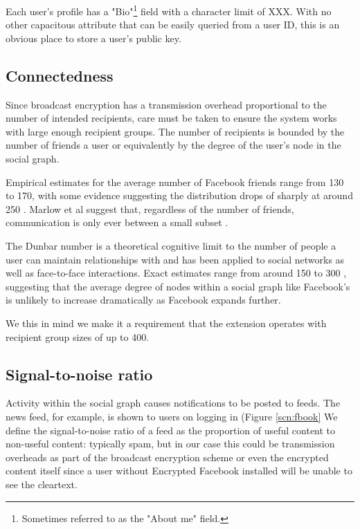 Each user's profile has a "Bio"\footnote{Sometimes referred to as the "About me" field.} field with a character limit of XXX. With no other capacitous attribute that can be easily queried from a user ID, this is an obvious place to store a user's public key.

    
\FloatBarrier
\subsection{Connectedness}

Since broadcast encryption has a transmission overhead proportional to the number of intended recipients, care must be taken to ensure the system works with large enough recipient groups. The number of recipients is bounded by the number of friends a user or equivalently by the degree of the user's node in the social graph. 

Empirical estimates for the average number of Facebook friends range from 130 to 170, with some evidence suggesting the distribution drops of sharply at around 250 \cite{fb-factsheet} \cite{fb-connectedness}. Marlow et al suggest that, regardless of the number of friends, communication is only ever between a small subset \cite{burke2010social}.

The Dunbar number is a theoretical cognitive limit to the number of people a user can maintain relationships with and has been applied to social networks as well as face-to-face interactions. Exact estimates range from around 150 to 300 \cite{xxx} \cite{xxx}, suggesting that the average degree of nodes within a social graph like Facebook's is unlikely to increase dramatically as Facebook expands further.

We this in mind we make it a requirement that the extension operates with recipient group sizes of up to 400.


\FloatBarrier
\subsection{Signal-to-noise ratio}

Activity within the social graph causes notifications to be posted to feeds. The news feed, for example, is shown to users on logging in (Figure \ref{scn:fbook}  We define the signal-to-noise ratio of a feed as the proportion of useful content to non-useful content: typically spam, but in our case this could be transmission overheads as part of the broadcast encryption scheme or even the encrypted content itself since a user without Encrypted Facebook installed will be unable to see the cleartext.

